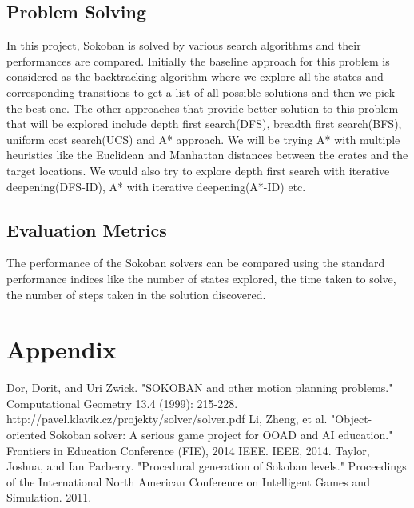 \documentclass[10pt, final]{article}
\begin{document}
	\subsection{Problem Solving}
	In this project, Sokoban is solved by various search algorithms and their performances are compared. Initially the baseline approach for this problem is considered as the backtracking algorithm where we explore all the states and corresponding transitions to get a list of all possible solutions and then we pick the best one. The other approaches that provide better solution to this problem that will be explored include depth first search(DFS), breadth first search(BFS), uniform cost search(UCS) and A* approach. We will be trying A* with multiple heuristics like the Euclidean and Manhattan distances between the crates and the target locations. We would also try to explore depth first search with iterative deepening(DFS-ID), A* with iterative deepening(A*-ID) etc.
	
	
	\subsection{Evaluation Metrics}
	The performance of the Sokoban solvers can be compared using the standard performance indices like the number of states explored, the time taken to solve, the number of steps taken in the solution discovered.
	\section{Appendix}
	
	
	\begin{thebibliography}{1}
		 Dor, Dorit, and Uri Zwick. "SOKOBAN and other motion planning problems." Computational Geometry 13.4 (1999): 215-228.
		 http://pavel.klavik.cz/projekty/solver/solver.pdf 
		 Li, Zheng, et al. "Object-oriented Sokoban solver: A serious game project for OOAD and AI education." Frontiers in Education Conference (FIE), 2014 IEEE. IEEE, 2014.
		 Taylor, Joshua, and Ian Parberry. "Procedural generation of Sokoban levels." Proceedings of the International North American Conference on Intelligent Games and Simulation. 2011.
	\end{thebibliography}
	
\end{document}
